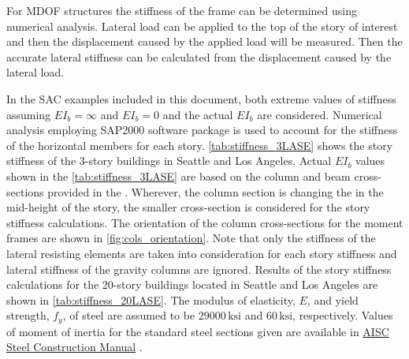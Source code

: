 \documentclass[onecolumn, fleqn]{article}
\newcommand{\ksi}{\ensuremath{\,\mathrm{ksi}}}
\begin{document}
For MDOF structures the stiffness of the frame can be determined using numerical analysis. Lateral load can be applied to the top of the story of interest and then the displacement caused by the applied load will be measured. Then the accurate lateral stiffness can be calculated from the displacement caused by the lateral load. 

In the SAC examples included in this document, both extreme values of stiffness assuming $EI_b = \infty$ and $EI_b = 0$ and the actual $EI_b$ are considered. Numerical analysis employing SAP2000 \citep{sap2000} software package is used to account for the stiffness of the horizontal members for each story. \cref{tab:stiffness_3LASE} shows the story stiffness of the 3-story buildings in Seattle and Los Angeles. Actual $EI_b$ values shown in the \cref{tab:stiffness_3LASE} are based on the column and beam cross-sections provided in the \citet{FEMA335c2000}. Wherever, the column section is changing the in the mid-height of the story, the smaller cross-section is considered for the story stiffness calculations. The orientation of the column cross-sections for the moment frames are shown in \cref{fig:cols_orientation}. Note that only the stiffness of the lateral resisting elements are taken into consideration for each story stiffness and lateral stiffness of the gravity columns are ignored. Results of the story stiffness calculations for the 20-story buildings located in Seattle and Los Angeles are shown in \cref{tab:stiffness_20LASE}. The modulus of elasticity, $E$, and yield strength, $f_y$, of steel are assumed to be $29000 \ksi$ and $60 \ksi$, respectively. Values of moment of inertia for the standard steel sections given are available in \href{https://www.aisc.org/publications/steel-construction-manual-resources/}{AISC Steel Construction Manual} \citep{aiscManual}.
\end{document}

